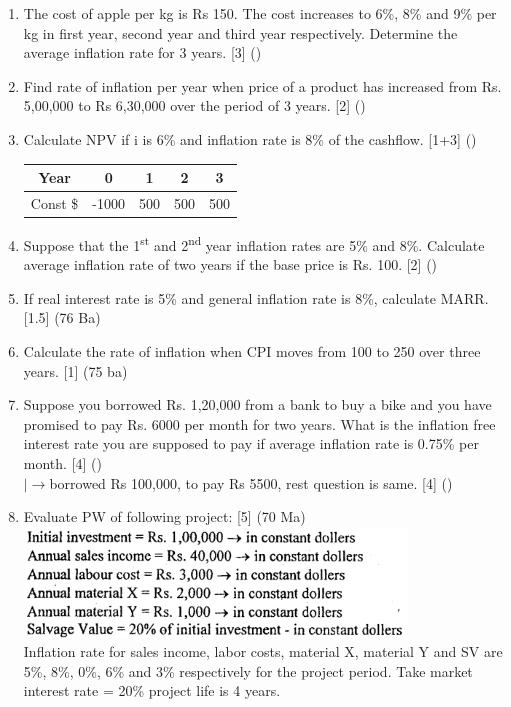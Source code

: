 \documentclass[12pt]{article}
\newcommand{\lb}{\\ $\left|\rightarrow\right.$}
\newcommand{\super}[1]{\textsuperscript{#1}}
\begin{document}
\begin{enumerate}
			\item The cost of apple per kg is Rs 150. The cost increases to 6\%, 8\% and 9\% per kg in first year, second year and third year respectively. Determine the average inflation rate for 3 years. \hfill [3] ()

			\item Find rate of inflation per year when price of a product has increased from Rs. 5,00,000 to Rs 6,30,000 over the period of 3 years. \hfill [2] ()

			\item Calculate NPV if i is 6\% and inflation rate is 8\% of the cashflow. \hfill [1+3] ()
			\begin{tabular}{|c|c|c|c|c|}
				\hline
				Year & 0 & 1 & 2 & 3 \\ \hline
				Const \$ & -1000 & 500 & 500 & 500 \\ \hline
			\end{tabular}

			\item Suppose that the 1\super{st} and 2\super{nd} year inflation rates are 5\% and 8\%. Calculate average inflation rate of two years if the base price is Rs. 100. \hfill [2] ()

			\item If real interest rate is 5\% and general inflation rate is 8\%, calculate MARR. \hfill [1.5] (76 Ba)

			\item Calculate the rate of inflation when CPI moves from 100 to 250 over three years. \hfill [1] (75 ba)

			\item Suppose you borrowed Rs. 1,20,000 from a bank to buy a bike and you have promised to pay Rs. 6000 per month for two years. What is the inflation free interest rate you are supposed to pay if average inflation rate is 0.75\% per month. \hfill [4] ()
			\lb borrowed Rs 100,000, to pay Rs 5500, rest question is same. \hfill [4] ()

			\item Evaluate PW of following project: \hfill [5] (70 Ma)
			\includegraphics[width=4in]{./pics/ee_7}\\
			Inflation rate for sales income, labor costs, material X, material Y and SV are 5\%, 8\%, 0\%, 6\% and 3\% respectively for the project period. Take market interest rate = 20\% project life is 4 years.


\end{enumerate}
\end{document}
